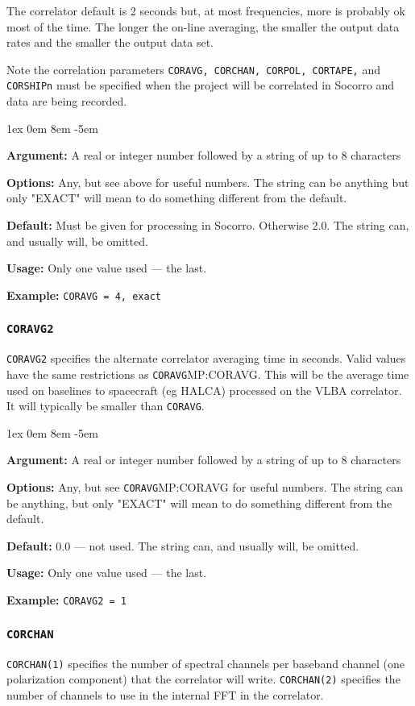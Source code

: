 \documentclass{report}
\newcommand{\rcwbox}[5]{
  \begin{list}{}{\parsep 1ex  \itemsep 0em
                 \leftmargin 8em  \itemindent -5em }
    \item {\bf Argument:} #1
    \item {\bf Options:}  #2
    \item {\bf Default:}  #3
    \item {\bf Usage:}    #4
    \item {\bf Example:}  #5
  \end{list}
}
\begin{document}
The correlator default is 2 seconds but, at most frequencies, more is
probably ok most of the time.  The longer the on-line averaging, the
smaller the output data rates and the smaller the output data set.

Note the correlation parameters {\tt CORAVG, CORCHAN,
CORPOL, CORTAPE,} and {\tt CORSHIPn} must be specified when
the project will be correlated in Socorro and data
are being recorded.

\rcwbox
{A real or integer number followed by a string of up to 8 characters}
{Any, but see above for useful numbers. The string can be anything but
only "EXACT" will mean to do something different from the default.}
{Must be given for processing in Socorro.  Otherwise 2.0.  The string
can, and usually will, be omitted.}
{Only one value used --- the last.}
{{\tt CORAVG = 4, exact}}

\subsubsection{\label{MP:CORAVG2}{\tt CORAVG2}}

{\tt CORAVG2} specifies the alternate correlator averaging time in
seconds.  Valid values have the same restrictions as \htmlref
{{\tt CORAVG}}{MP:CORAVG}.  This will be the average time used
on baselines to spacecraft (eg HALCA) processed on the VLBA correlator.
It will typically be smaller than {\tt CORAVG}.

\rcwbox
{A real or integer number followed by a string of up to 8 characters}
{Any, but see \htmlref
{{\tt CORAVG}}{MP:CORAVG} for useful numbers. The string can be anything, but
only "EXACT" will mean to do something different from the default.}
{0.0 --- not used.  The string can, and usually will, be omitted.}
{Only one value used --- the last.}
{{\tt CORAVG2 = 1}}

\subsubsection{\label{MP:CORCHAN}{\tt CORCHAN}}

{\tt CORCHAN(1)} specifies the number of spectral channels per baseband
channel (one polarization component) that the correlator will write.
{\tt CORCHAN(2)} specifies the number of channels to use in the internal
FFT in the correlator.
\end{document}
